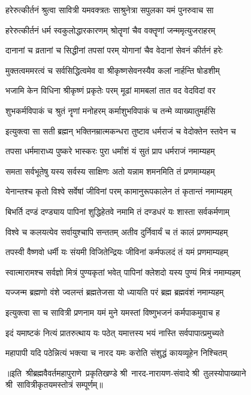 

\twolineshloka
{हरेरुत्कीर्तनं श्रुत्वा सावित्री यमवक्त्रतः}
{साश्रुनेत्रा सपुलका यमं पुनरुवाच सा}%

\twolineshloka
{हरेरुत्कीर्तनं धर्म स्वकुलोद्धारकारणम्}
{श्रोतॄणां चैव वक्तॄणां जन्ममृत्युजराहरम्}%

\twolineshloka
{दानानां च व्रतानां च सिद्धीनां तपसां परम्}
{योगानां चैव वेदानां सेवनं कीर्तनं हरेः}%

\twolineshloka
{मुक्तत्वममरत्वं च सर्वसिद्धित्वमेव वा}
{श्रीकृष्णसेवनस्यैव कलां नार्हन्ति षोडशीम्}%

\twolineshloka
{भजामि केन विधिना श्रीकृष्णं प्रकृतेः परम्}
{मूढां मामबलां तात वद वेदविदां वर}%

\twolineshloka
{शुभकर्मविपाकं च श्रुतं नॄणां मनोहरम्}
{कर्माशुभविपाकं च तन्मे व्याख्यातुमर्हसि}%

\twolineshloka
{इत्युक्त्वा सा सती ब्रह्मन् भक्तिनम्रात्मकन्धरा}
{तुष्टाव धर्मराजं च वेदोक्तेन स्तवेन च}%

\twolineshloka
{तपसा धर्ममाराध्य पुष्करे भास्करः पुरा}
{धर्मांशं यं सुतं प्राप धर्मराजं नमाम्यहम्}%

\twolineshloka
{समता सर्वभूतेषु यस्य सर्वस्य साक्षिणः}
{अतो यन्नाम शमनमिति तं प्रणमाम्यहम्}%

\twolineshloka
{येनान्तश्च कृतो विश्वे सर्वेषां जीविनां परम्}
{कामानुरूपकालेन तं कृतान्तं नमाम्यहम्}%

\twolineshloka
{बिभर्ति दण्डं दण्ड्याय पापिनां शुद्धिहेतवे}
{नमामि तं दण्डधरं यः शास्ता सर्वकर्मणाम्}%

\twolineshloka
{विश्वे च कलयत्येव सर्वायुश्चापि सन्ततम्}
{अतीव दुर्निवार्यं च तं कालं प्रणमाम्यहम्}%

\twolineshloka
{तपस्वी वैष्णवो धर्मी यः संयमी विजितेन्द्रियः}
{जीविनां कर्मफलदं तं यमं प्रणमाम्यहम्}%

\twolineshloka
{स्वात्मारामश्च सर्वज्ञो मित्रं पुण्यकृतां भवेत्}
{पापिनां क्लेशदो यस्य पुण्यं मित्रं नमाम्यहम्}%

\twolineshloka
{यज्जन्म ब्रह्मणो वंशे ज्वलन्तं ब्रह्मतेजसा}
{यो ध्यायति परं ब्रह्म ब्रह्मवंशं नमाम्यहम्}%

\twolineshloka
{इत्युक्त्वा सा च सावित्री प्रणनाम यमं मुने}
{यमस्तां विष्णुभजनं कर्मपाकमुवाच ह}%

\twolineshloka
{इदं यमाष्टकं नित्यं प्रातरुत्थाय यः पठेत्}
{यमात्तस्य भयं नास्ति सर्वपापात्प्रमुच्यते}%

\twolineshloka
{महापापी यदि पठेन्नित्यं भक्त्या च नारद}
{यमः करोति संशुद्धं कायव्यूहेन निश्चितम्}%

{॥इति~श्रीब्रह्मवैवर्तमहापुराणे~प्रकृतिखण्डे श्री~नारद-नारायण-संवादे श्री~तुलस्योपाख्याने श्री~सावित्रीकृतयमस्तोत्रं सम्पूर्णम्॥}